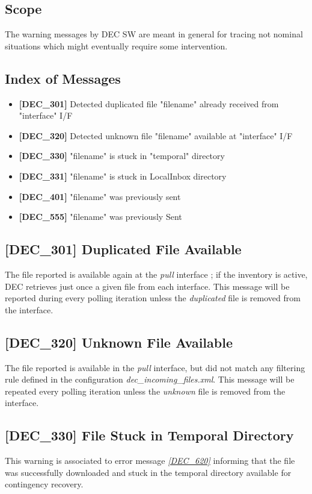 \documentclass[dec_sum_main.tex]{subfiles}
\begin{document}
\subsection{Scope}
The warning messages by DEC SW are meant in general for tracing not nominal situations which might eventually require some intervention.

\subsection{Index of Messages}

\begin{itemize}
	\item \textbf{[DEC\_301]} Detected duplicated file "filename" already received from "interface" I/F
	\item \textbf{[DEC\_320]} Detected unknown file "filename" available at "interface" I/F
	\item \textbf{[DEC\_330]} "filename" is stuck in "temporal" directory
	\item \textbf{[DEC\_331]} "filename" is stuck in LocalInbox directory
	\item \textbf{[DEC\_401]} "filename" was previously sent
	\item \textbf{[DEC\_555]} "filename" was previously Sent
\end{itemize}

\label{DEC301}
\subsection{[DEC\_301] Duplicated File Available}
The file reported is available again at the \textit{pull} interface ; if the inventory is active, DEC retrieves just once a given file from each interface. This message will be reported during every polling iteration unless the \textit{duplicated} file is removed from the interface.

\label{DEC320}
\subsection{[DEC\_320] Unknown File Available}
The file reported is available in the \textit{pull} interface, but did not match any filtering rule defined in the configuration \textit{dec\_incoming\_files.xml}. This message will be repeated every polling iteration unless the \textit{unknown} file is removed from the interface.

\label{DEC330}
\subsection{[DEC\_330] File Stuck in Temporal Directory}
This warning is associated to error message \hyperref[DEC620]{\textit{[DEC\_620]}} informing that the file was successfully downloaded and stuck in the temporal directory available for contingency recovery.
\end{document}

